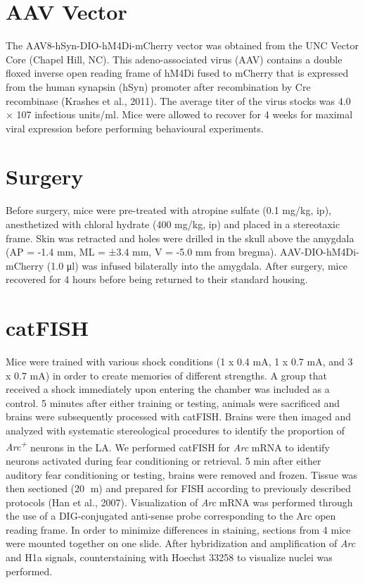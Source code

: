 \documentclass[12pt,a4paper,]{report}
\begin{document}
\section{AAV Vector}\label{aav-vector}

The AAV8-hSyn-DIO-hM4Di-mCherry vector was obtained from the UNC Vector
Core (Chapel Hill, NC). This adeno-associated virus (AAV) contains a
double floxed inverse open reading frame of hM4Di fused to mCherry that
is expressed from the human synapsin (hSyn) promoter after recombination
by Cre recombinase (Krashes et al., 2011). The average titer of the
virus stocks was 4.0 × 107 infectious units/ml. Mice were allowed to
recover for 4 weeks for maximal viral expression before performing
behavioural experiments.

\section{Surgery}\label{surgery}

Before surgery, mice were pre-treated with atropine sulfate (0.1 mg/kg,
ip), anesthetized with chloral hydrate (400 mg/kg, ip) and placed in a
stereotaxic frame. Skin was retracted and holes were drilled in the
skull above the amygdala (AP = -1.4 mm, ML = ±3.4 mm, V = -5.0 mm from
bregma). AAV-DIO-hM4Di-mCherry (1.0 μl) was infused bilaterally into the
amygdala. After surgery, mice recovered for 4 hours before being
returned to their standard housing.

\section{catFISH}\label{catfish}

Mice were trained with various shock conditions (1 x 0.4 mA, 1 x 0.7 mA,
and 3 x 0.7 mA) in order to create memories of different strengths. A
group that received a shock immediately upon entering the chamber was
included as a control. 5 minutes after either training or testing,
animals were sacrificed and brains were subsequently processed with
catFISH. Brains were then imaged and analyzed with systematic
stereological procedures to identify the proportion of
\emph{Arc\textsuperscript{+}} neurons in the LA. We performed catFISH
for \emph{Arc} mRNA to identify neurons activated during fear
conditioning or retrieval. 5 min after either auditory fear conditioning
or testing, brains were removed and frozen. Tissue was then sectioned
(20 m) and prepared for FISH according to previously described
protocols (Han et al., 2007). Visualization of \emph{Arc} mRNA was
performed through the use of a DIG-conjugated anti-sense probe
corresponding to the Arc open reading frame. In order to minimize
differences in staining, sections from 4 mice were mounted together on
one slide. After hybridization and amplification of \emph{Arc} and H1a
signals, counterstaining with Hoechst 33258 to visualize nuclei was
performed.
\end{document}
